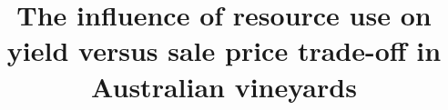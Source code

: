 \documentclass[review,12pt,authoryear]{elsarticle}
\begin{document}
\begin{linenumbers}
\begin{frontmatter}
\title{The influence of resource use on yield versus sale price trade-off in Australian vineyards}

\end{frontmatter}
\end{linenumbers}
\end{document}
